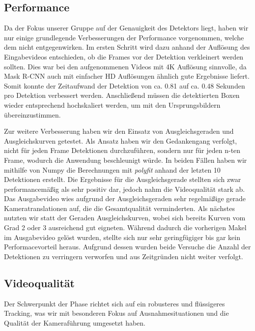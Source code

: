 \subsection*{Performance}
Da der Fokus unserer Gruppe auf der Genauigkeit des Detektors liegt, haben wir nur einige grundlegende Verbesserungen der Performance vorgenommen, welche dem nicht entgegenwirken. 
Im ersten Schritt wird dazu anhand der Auflösung des Eingabevideos entschieden, ob die Frames vor der Detektion verkleinert werden sollten. Dies war bei den aufgenommenen Videos mit 4K Auflösung sinnvolle, da Mask R-CNN auch mit einfacher HD Auflösungen ähnlich gute Ergebnisse liefert. Somit konnte der Zeitaufwand der Detektion von ca. 0.81 auf ca. 0.48 Sekunden pro Detektion verbessert werden. Anschließend müssen die detektierten Boxen wieder entsprechend hochskaliert werden, um mit den Ursprungsbildern übereinzustimmen.

Zur weitere Verbesserung haben wir den Einsatz von Ausgleichsgeraden und Ausgleichskurven getestet. Als Ansatz haben wir den Gedankengang verfolgt, nicht für jeden Frame Detektionen durchzuführen, sondern nur für jeden \linebreak n-ten Frame, wodurch die Anwendung beschleunigt würde. 
In beiden Fällen haben wir mithilfe von Numpy die Berechnungen mit \emph{polyfit} anhand der letzten 10 Detektionen erstellt. Die Ergebnisse für die Ausgleichsgerade stellten sich zwar performancemäßig als sehr positiv dar, jedoch nahm die Videoqualität stark ab. Das Ausgabevideo wies aufgrund der Ausgleichsgeraden sehr regelmäßige gerade Kameratranslationen auf, die die Gesamtqualität verminderten.
Als nächstes nutzten wir statt der Geraden Ausgleichskurven, wobei sich bereits Kurven vom Grad 2 oder 3 ausreichend gut eigneten. Während dadurch die vorherigen Makel im Ausgabevideo gelöst wurden, stellte sich nur sehr geringfügiger bis gar kein Performacevorteil heraus. Aufgrund dessen wurden beide Versuche die Anzahl der Detektionen zu verringern verworfen und aus Zeitgründen nicht weiter verfolgt.




\subsection*{Videoqualität}
Der Schwerpunkt der Phase richtet sich auf ein robusteres und flüssigeres Tracking, was wir mit besonderen Fokus auf Ausnahmesituationen und die Qualität der Kameraführung umgesetzt haben.



